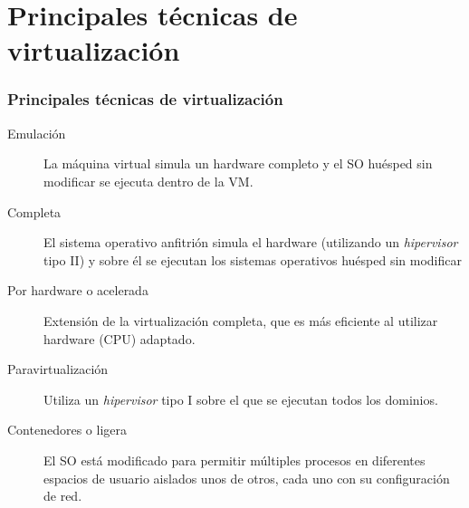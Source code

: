 \documentclass{beamer}
\begin{document}
\section{Principales técnicas de virtualización}
\begin{frame} \frametitle{Principales técnicas de virtualización}
  \begin{description}
  \item[Emulación] La máquina virtual simula un hardware completo y el
    SO huésped sin modificar se ejecuta dentro de la VM.
  \item[Completa] El sistema operativo anfitrión simula
    el hardware (utilizando un \emph{hipervisor} tipo II) y sobre él se
    ejecutan los sistemas operativos huésped sin modificar
  \item[Por hardware o acelerada] Extensión de la virtualización
    completa, que es más eficiente al utilizar hardware (CPU) 
    adaptado.
  \item[Paravirtualización] Utiliza un \emph{hipervisor} tipo I sobre
    el que se ejecutan todos los dominios.
  \item[Contenedores o ligera] El SO está modificado para permitir múltiples
    procesos en diferentes espacios de usuario aislados unos de otros,
    cada uno con su configuración de red.
  \end{description}
\end{frame}
\end{document}
